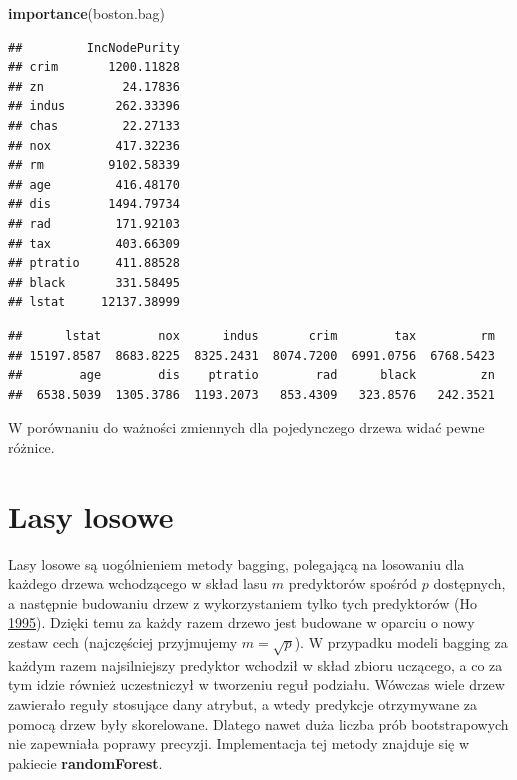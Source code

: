 \documentclass[]{book}
\newenvironment{Shaded}{\begin{snugshade}}{\end{snugshade}}
\newcommand{\KeywordTok}[1]{\textcolor[rgb]{0.13,0.29,0.53}{\textbf{#1}}}
\newcommand{\NormalTok}[1]{#1}
\newcommand{\OperatorTok}[1]{\textcolor[rgb]{0.81,0.36,0.00}{\textbf{#1}}}
\theoremstyle{plain}
\theoremstyle{definition}
\theoremstyle{definition}
\theoremstyle{definition}
\theoremstyle{definition}
\theoremstyle{remark}
\begin{document}
\begin{Shaded}
\begin{Highlighting}[]
\KeywordTok{importance}\NormalTok{(boston.bag)}
\end{Highlighting}
\end{Shaded}

\begin{verbatim}
##         IncNodePurity
## crim       1200.11828
## zn           24.17836
## indus       262.33396
## chas         22.27133
## nox         417.32236
## rm         9102.58339
## age         416.48170
## dis        1494.79734
## rad         171.92103
## tax         403.66309
## ptratio     411.88528
## black       331.58495
## lstat     12137.38999
\end{verbatim}

\begin{Shaded}
\end{Shaded}

\begin{verbatim}
##      lstat        nox      indus       crim        tax         rm 
## 15197.8587  8683.8225  8325.2431  8074.7200  6991.0756  6768.5423 
##        age        dis    ptratio        rad      black         zn 
##  6538.5039  1305.3786  1193.2073   853.4309   323.8576   242.3521
\end{verbatim}

W porównaniu do ważności zmiennych dla pojedynczego drzewa widać pewne różnice.

\hypertarget{lasy-losowe}{%
\section{Lasy losowe}\label{lasy-losowe}}

Lasy losowe są uogólnieniem metody bagging, polegającą na losowaniu dla każdego drzewa wchodzącego w skład lasu \(m\) predyktorów spośród \(p\) dostępnych, a następnie budowaniu drzew z wykorzystaniem tylko tych predyktorów (Ho \protect\hyperlink{ref-ho1995}{1995}). Dzięki temu za każdy razem drzewo jest budowane w oparciu o nowy zestaw cech (najczęściej przyjmujemy \(m=\sqrt{p}\)). W przypadku modeli bagging za każdym razem najsilniejszy predyktor wchodził w skład zbioru uczącego, a co za tym idzie również uczestniczył w tworzeniu reguł podziału. Wówczas wiele drzew zawierało reguły stosujące dany atrybut, a wtedy predykcje otrzymywane za pomocą drzew były skorelowane. Dlatego nawet duża liczba prób bootstrapowych nie zapewniała poprawy precyzji. Implementacja tej metody znajduje się w pakiecie \textbf{randomForest}.
\end{document}

